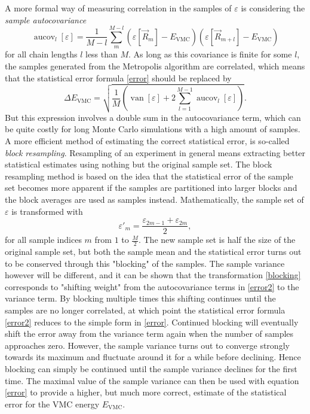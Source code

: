 \documentclass[a4paper,8pt]{article}
\DeclareMathOperator{\van}{van}
\DeclareMathOperator{\aucov}{aucov}
\begin{document}
\begin{multicols}{2}
A more formal way of measuring correlation in the samples of $\varepsilon$ is considering the \textit{sample autocovariance}
\begin{equation}
\aucov_l[\varepsilon] = \frac{1}{M-l}\sum\limits_m^{M-l} \left(\varepsilon[\vec{R}_m]-E_\text{VMC}\right)\left(\varepsilon[\vec{R}_{m+l}]-E_\text{VMC}\right)
\end{equation}
for all chain lengths $l$ less than $M$. As long as this covariance is finite for some $l$, the samples generated from the Metropolis algorithm are correlated, which means that the statistical error formula \eqref{error} should be replaced by
\begin{equation}\label{error2}
\Delta E_\text{VMC} = \sqrt{\frac{1}{M} \left(\van[\varepsilon]+2\sum\limits_{l=1}^{M-1} \aucov_l[\varepsilon]\right)}.
\end{equation}
But this expression involves a double sum in the autocovariance term, which can be quite costly for long Monte Carlo simulations with a high amount of samples. A more efficient method of estimating the correct statistical error, is so-called \textit{block resampling}. Resampling of an experiment in general means extracting better statistical estimates using nothing but the original sample set. The block resampling method is based on the idea that the statistical error of the sample set becomes more apparent if the samples are partitioned into larger blocks and the block averages are used as samples instead. Mathematically, the sample set of $\varepsilon$ is transformed with
\begin{equation}\label{blocking}
\varepsilon'_m = \frac{\varepsilon_{2m-1}+\varepsilon_{2m}}{2},
\end{equation}
for all sample indices $m$ from $1$ to $\frac{M}{2}$. The new sample set is half the size of the original sample set, but both the sample mean and the statistical error turns out to be conserved through this "blocking" of the samples. The sample variance however will be different, and it can be shown that the transformation \eqref{blocking} corresponds to "shifting weight" from the autocovariance terms in \eqref{error2} to the variance term. By blocking multiple times this shifting continues until the samples are no longer correlated, at which point the statistical error formula \eqref{error2} reduces to the simple form in \eqref{error}. Continued blocking will eventually shift the error away from the variance term again when the number of samples approaches zero. However, the sample variance turns out to converge strongly towards its maximum and fluctuate around it for a while before declining. Hence blocking can simply be continued until the sample variance declines for the first time. The maximal value of the sample variance can then be used with equation \eqref{error} to provide a higher, but much more correct, estimate of the statistical error for the VMC energy $E_\text{VMC}$.




\end{multicols}
\end{document}
